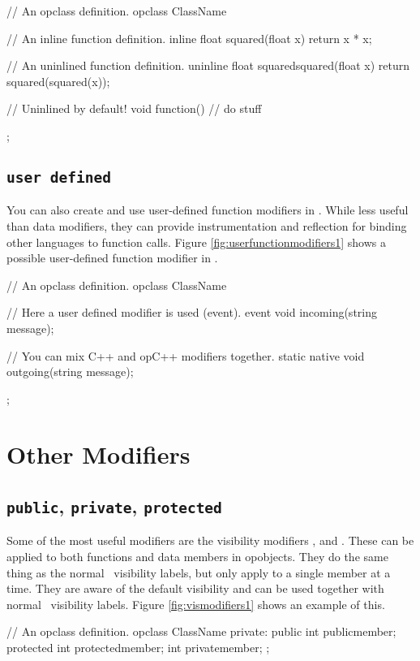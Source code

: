 \begin{opcpp}[label={fig:inline1},caption={Using the \opcppK{inline} and \opcppK{uninline} keywords in \opCPP.}]
// An opclass definition.
opclass ClassName
{
	// An inline function definition.
	inline float squared(float x)
	{
		return x * x;
	}

	// An uninlined function definition.
	uninline float squaredsquared(float x)
	{
		return squared(squared(x));
	}

	// Uninlined by default!
	void function()
	{
		// do stuff
	}
};
\end{opcpp}

\pagebreak

\subsection{{\tt user defined}}

You can also create and use user-defined function modifiers in \opCPP.  While less useful than data modifiers, they can provide instrumentation and reflection for binding other languages to function calls.  Figure \ref{fig:userfunctionmodifiers1} shows a possible user-defined function modifier in \opCPP.

\begin{opcpp}[label={fig:userfunctionmodifiers1},caption={User-defined function modifiers in \opCPP.}]
// An opclass definition.
opclass ClassName
{
	// Here a user defined modifier is used (event).
	event void incoming(string message);

	// You can mix C++ and opC++ modifiers together.
	static native void outgoing(string message);
};
\end{opcpp}

\section{Other Modifiers}

\subsection{{\tt public}, {\tt private}, {\tt protected}}

Some of the most useful modifiers are the visibility modifiers ,  and .  These can be applied to both functions and data members in opobjects.  They do the same thing as the normal \cpp\ visibility labels, but only apply to a single member at a time.  They are aware of the default visibility and can be used together with normal \cpp\ visibility labels.  Figure \ref{fig:vismodifiers1} shows an example of this.

\begin{opcpp}[label={fig:vismodifiers1},caption={Visibility modifiers \opcppK{public}, \opcppK{private} and \opcppK{protected} in \opCPP.}]
// An opclass definition.
opclass ClassName
{
private:
	public    int publicmember;
	protected int protectedmember;
	          int privatemember;
};
\end{opcpp}
